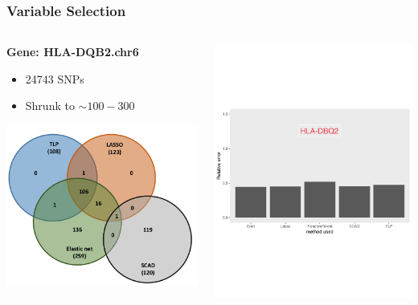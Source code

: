\documentclass[table]{beamer}
\begin{document}
\begin{frame}
\frametitle{Variable Selection}
\begin{columns}[T]
 \begin{column}{0.5\textwidth}
 \textbf{Gene: HLA-DQB2.chr6}
 \begin{itemize}
 \item 24743 SNPs
 \item Shrunk to $\sim 100 - 300$
 \end{itemize}
   \includegraphics[scale = 0.33]{venndiagram.png}
   \end{column}
    \begin{column}{0.5\textwidth}
    \vspace*{-0.2cm}
    \includegraphics[scale = 0.2]{HLADQB2.pdf}

\end{column}
\end{columns}
\end{frame}
\end{document}
